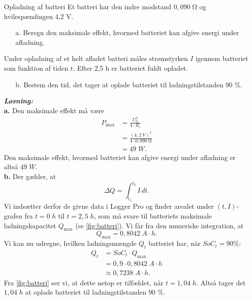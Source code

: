 \documentclass{report}
\newcommand{\sol}{\setlength{\parindent}{0cm}\textbf{\textit{Løsning:}}\setlength{\parindent}{1cm}}
\begin{document}
\begin{question}{Opladning af batteri}{}
Et batteri har den indre modstand $0,090 \;\unit{\ohm}$ og hvilespændingen 4,2 V.
\begin{itemize}
  \item[a.] Beregn den maksimale effekt, hvormed batteriet kan afgive energi under afladning.
\end{itemize}
Under opladning af et helt afladet batteri måles strømstyrken $I$ igennem
batteriet som funktion af tiden $t$.
Efter 2,5 h er batteriet fuldt opladet.
\begin{itemize}
  \item[b.] Bestem den tid, det tager at oplade batteriet til ladningstilstanden 90 \%.
\end{itemize}
\end{question}
\sol \\
\textbf{a.}
Den maksimale effekt må være
\begin{equation*}
\begin{split}
  P _{\text{max} }&=\frac{U_0^2}{4 \cdot R_i}\\
  &=\frac{\left(4,2 \;\unit{V} \right) ^2}{4 \cdot 0,090 \;\unit{\ohm}}\\
  &=49 \;\unit{W}.
\end{split}
\end{equation*}
Den maksimale effekt, hvormed batteriet kan afgive energi under afladning er altså $49 \;\unit{W}$.\\[1ex]
\textbf{b.}
Der gælder, at
\[
\Delta Q= \int_{t_1}^{t_2} I \,dt. 
\] 
Vi indsætter derfor de givne data i Logger Pro og finder arealet under $(t, I)$-grafen fra $t=0 \;\unit{h} $ til $t=2,5 \;\unit{h}$, som må svare til batteriets maksimale ladningskapacitet $Q _{\text{max} }$ (se \cref{fig:batteri}).
Vi får fra den numeriske integration, at
\[
Q _{\text{max} }=0,8042 \;\unit{A \cdot h}.
\] 
Vi kan nu udregne, hvilken ladningsmængde $Q_t$ batteriet har, når $SoC_t=90 \%$:
\begin{equation*}
\begin{split}
  Q_t &= SoC_t \cdot Q _{\text{max} }\\
  &= 0,9 \cdot 0,8042 \;\unit{A \cdot h} \\
  &\approx 0,7238 \;\unit{A \cdot h}. 
\end{split}
\end{equation*}
Fra \cref{fig:batteri} ser vi, at dette netop er tilfældet, når $t=1,04 \;\unit{h}$.
Altså tager det $1,04 \;\unit{h}$ at oplade batteriet til ladningstilstanden 90 \%.
\end{document}
